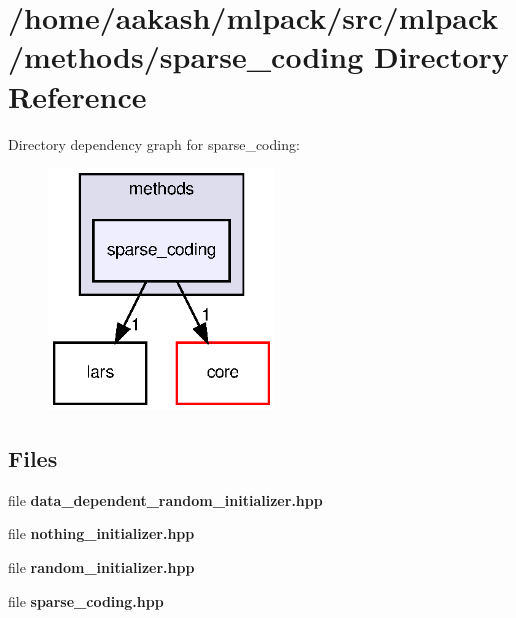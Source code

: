 \section{/home/aakash/mlpack/src/mlpack/methods/sparse\+\_\+coding Directory Reference}
\label{dir_00f0bd3cdd3257def9baafb81b12c5d0}
Directory dependency graph for sparse\+\_\+coding\+:
\nopagebreak
\begin{figure}[H]
\begin{center}
\leavevmode
\includegraphics[width=170pt]{dir_00f0bd3cdd3257def9baafb81b12c5d0_dep}
\end{center}
\end{figure}
\subsection*{Files}
\begin{DoxyCompactItemize}
\item 
file \textbf{ data\+\_\+dependent\+\_\+random\+\_\+initializer.\+hpp}
\item 
file \textbf{ nothing\+\_\+initializer.\+hpp}
\item 
file \textbf{ random\+\_\+initializer.\+hpp}
\item 
file \textbf{ sparse\+\_\+coding.\+hpp}
\end{DoxyCompactItemize}
